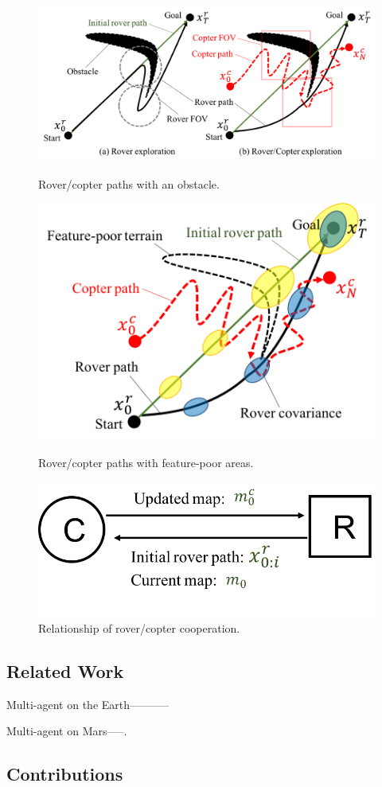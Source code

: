 \documentclass[conference]{IEEEtran}
\begin{document}
\begin{figure}[h]
		\centering
		\includegraphics[width=1.0\columnwidth]{figs/8_1.png}
		\caption{Rover/copter paths with an obstacle.}
		\label{fig:8_1}
		\centering
		\includegraphics[width=0.6\columnwidth]{figs/8_2.png}
		\caption{Rover/copter paths with feature-poor areas.}
		\label{fig:8_2}
		\vspace{5mm}
		\centering
		\includegraphics[width=0.6\columnwidth]{figs/8_4.png}
		\caption{Relationship of rover/copter cooperation.}
		\label{fig:8_4}
\end{figure}

\subsection*{Related Work}
Multi-agent on the Earth-----------

Multi-agent on Mars-----.

\subsection*{Contributions}
\end{document}
